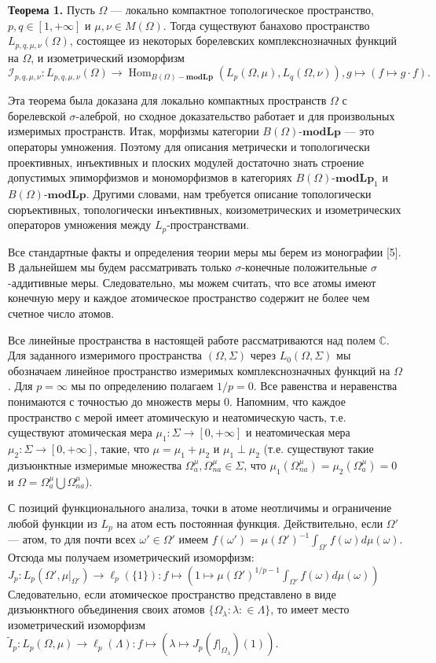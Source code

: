\documentclass[11pt,twoside]{article}
\begin{document}
\textbf{Теорема 1.} Пусть $\Omega$ --- локально компактное топологическое пространство, $p,q\in[1,+\infty]$ и $\mu,\nu\in M(\Omega)$. Тогда существуют банахово пространство $L_{p,q,\mu,\nu}(\Omega)$, состоящее из некоторых борелевских комплекснозначных функций на $\Omega$, и изометрический изоморфизм
$$
\mathcal{I}_{p,q,\mu,\nu}: L_{p,q,\mu,\nu}(\Omega)\to \operatorname{Hom}_{B(\Omega)\!-\!\mathbf{modLp}}(L_p(\Omega,\mu),L_q(\Omega,\nu)),g\mapsto (f\mapsto g\cdot f).
$$	


Эта теорема была доказана для локально компактных пространств $\Omega$ с борелевской $\sigma$-алеброй, но сходное доказательство работает и для произвольных измеримых пространств. Итак, морфизмы категории $B(\Omega)$-$\mathbf{modLp}$ --- это операторы умножения. Поэтому для описания метрически и топологически проективных, инъективных и плоских модулей достаточно знать строение допустимых эпиморфизмов и мономорфизмов в  категориях $B(\Omega)$-$\mathbf{modLp}_1$ и $B(\Omega)$-$\mathbf{modLp}$. Другими словами, нам требуется описание топологически сюръективных, топологически инъективных, коизометрических и изометрических операторов умножения между $L_p$-пространствами.

Все стандартные факты и определения теории меры мы берем из монографии [5]. В дальнейшем мы будем рассматривать только $\sigma$-конечные положительные $\sigma$-аддитивные меры. Следовательно, мы можем считать, что все атомы имеют конечную меру и каждое атомическое пространство содержит не более чем счетное число атомов.

Все линейные пространства в настоящей работе рассматриваются над полем $\mathbb{C}$.
Для заданного измеримого пространства $(\Omega,\Sigma)$ через $L_0(\Omega,\Sigma)$ мы обозначаем линейное пространство измеримых комплекснозначных функций на  $\Omega$. Для $p=\infty$ мы по определению полагаем $1/p=0$. Все равенства и неравенства понимаются с точностью до множеств меры $0$. Напомним, что каждое пространство с мерой имеет атомическую и неатомическую часть, т.е. существуют атомическая мера $\mu_1:\Sigma\to[0,+\infty]$ и неатомическая мера $\mu_2:\Sigma\to[0,+\infty]$, такие, что $\mu=\mu_1+\mu_2$ и $\mu_1\perp\mu_2$ (т.е. существуют такие дизъюнктные измеримые множества $\Omega_a^{\mu},\Omega_{na}^{\mu}\in\Sigma$, что $\mu_1(\Omega_{na}^{\mu})=\mu_2(\Omega_a^{\mu})=0$ и $\Omega=\Omega_a^{\mu}\bigcup\Omega_{na}^{\mu}$). 

С позиций функционального анализа, точки в атоме неотличимы и ограничение любой функции из $L_p$ на атом есть постоянная функция. Действительно, если $\Omega'$ --- атом, то для почти всех $\omega'\in\Omega'$ имеем $f(\omega')=\mu(\Omega')^{-1}\int_{\Omega'} f(\omega)d\mu(\omega)$. Отсюда мы получаем изометрический изоморфизм:
$J_p:L_p(\Omega',\mu|_{\Omega'})\to \ell_p(\{1\}):f\mapsto\left(1\mapsto \mu(\Omega')^{1/p-1}\int_{\Omega'} f(\omega)d\mu(\omega)\right)$
Следовательно, если атомическое пространство представлено в виде дизъюнктного объединения своих атомов $\{\Omega_\lambda:\lambda:\in\Lambda\}$, то имеет место изометрический изоморфизм
$\widetilde{I}_p:L_p(\Omega,\mu)\to \ell_p(\Lambda):f\mapsto\left (\lambda\mapsto J_p(f|_{\Omega_\lambda})(1)\right)$.
\end{document}
